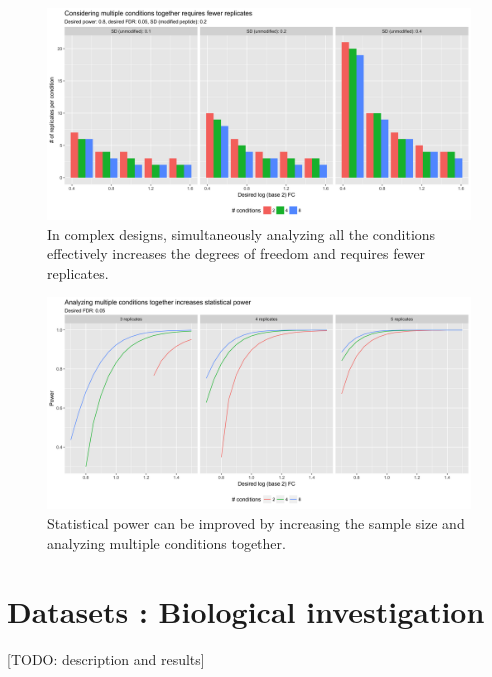 \documentclass{mcp}
\def\todo#1{{\color{red}[TODO: #1]}}
\begin{document}
\begin{figure}[h!]
\centering
\includegraphics[width=\textwidth]{sim/size_grp}
\caption{In complex designs, simultaneously analyzing all the conditions effectively increases the degrees of freedom and requires fewer replicates. \label{fig:size_grp}}
\end{figure}

\begin{figure}[h!]
\centering
\includegraphics[width=\textwidth]{sim/pwr_grp}
\caption{Statistical power can be improved by increasing the sample size and analyzing multiple conditions together. \label{fig:pwr_grp}}
\end{figure}


\clearpage
\section{Datasets : Biological investigation}

\todo{description and results}

\clearpage
\end{document}
